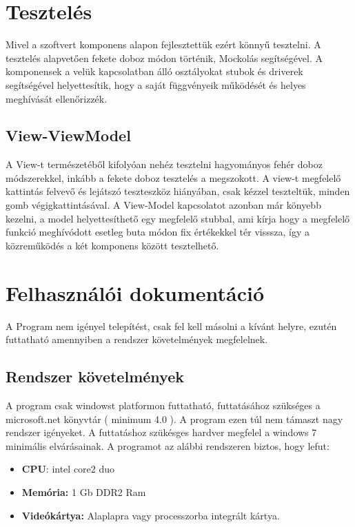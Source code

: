 \documentclass[a4paper,12pt]{report}
\begin{document}
\chapter{Tesztelés}

Mivel a szoftvert komponens alapon fejlesztettük ezért könnyű tesztelni. A tesztelés alapvetően fekete doboz módon történik, Mockolás segítségével. A komponensek a velük kapcsolatban álló osztályokat stubok és driverek segítségével helyettesítik, hogy a saját függvényeik működését és helyes meghívását ellenőrizzék.

\section{View-ViewModel}

A View-t természetéből kifolyóan nehéz tesztelni hagyományos fehér doboz módszerekkel, inkább a fekete doboz tesztelés a megszokott. A view-t megfelelő kattintás felvevő és lejátszó teszteszköz hiányában, csak kézzel teszteltük, minden gomb végigkattintásával. A View-Model kapcsolatot azonban már könyebb kezelni, a model helyettesíthető egy megfelelő stubbal, ami kírja hogy a megfelelő funkció meghívódott esetleg buta módon fix értékekkel tér visssza, így a közreműködés a két komponens között tesztelhető.

\chapter{Felhasználói dokumentáció}

A Program nem igényel telepítést, csak fel kell másolni a kívánt helyre, ezutén futtatható amennyiben a rendszer követelmények megfelelnek.

\section{Rendszer követelmények}

A program csak windowst platformon futtatható, futtatásához szükséges a microsoft.net könyvtár ( minimum 4.0 ).
A program ezen túl nem támaszt nagy rendszer igényeket. A futtatáshoz szükésges hardver megfelel a windows 7 minimális elvárásainak. A programot az alábbi rendszeren biztos, hogy lefut:
\begin{itemize}
\item {\bf CPU}: intel core2 duo
\item {\bf Memória:} 1 Gb DDR2 Ram
\item {\bf Videókártya:} Alaplapra vagy processzorba integrált kártya.
\end{itemize} 
\end{document}
